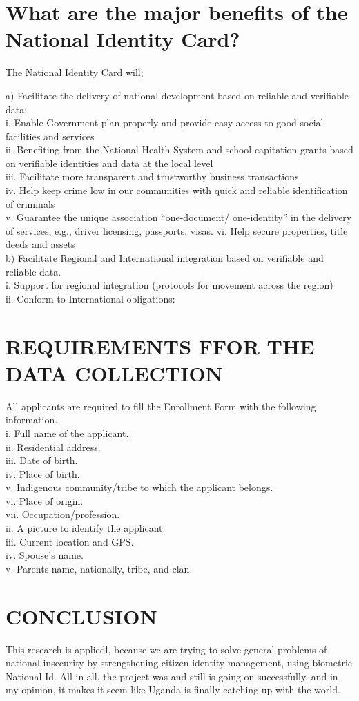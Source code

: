\documentclass[10pt,letterpaper]{article}
\begin{document}
\section{What are the major benefits of the National Identity Card?}
 The National Identity Card will;

a)	Facilitate the delivery of national development based on reliable and verifiable data:\\
i. Enable Government plan properly and provide easy access to good social facilities and services\\
ii. Benefiting from the National Health System and school capitation grants based on verifiable identities and data at the local level\\
iii. Facilitate more transparent and trustworthy business transactions\\
iv. Help keep crime low in our communities with quick and reliable identification of criminals\\
v. Guarantee the unique association “one-document/ one-identity” in the delivery of services, e.g., driver licensing, passports, visas.
vi. Help secure properties, title deeds and assets\\
b) Facilitate Regional and International integration based on verifiable and reliable data.\\
i. Support for regional integration (protocols for movement across the region)\\
ii. Conform to International obligations:\\

\section{REQUIREMENTS FFOR THE DATA COLLECTION}
All applicants are required to fill the Enrollment Form with the following information.\\
i.	Full name of the applicant.\\
ii. Residential address.\\
iii. Date of birth.\\
iv. Place of birth.\\
v. Indigenous community/tribe to which the applicant belongs.\\
vi. Place of origin.\\
vii. Occupation/profession.\\
ii.	A picture to identify the applicant.\\
iii.	Current location and GPS.\\
iv.	Spouse’s name.\\
v.	Parents name, nationally, tribe, and clan.\\

\section{CONCLUSION}
This research is appliedl, because we are trying to  solve general problems of  national  insecurity by strengthening citizen identity management, using biometric National Id. 
All in all, the project was and still is going on successfully, and in my opinion, it makes it seem like Uganda is finally catching up with the world.
\end{document}
